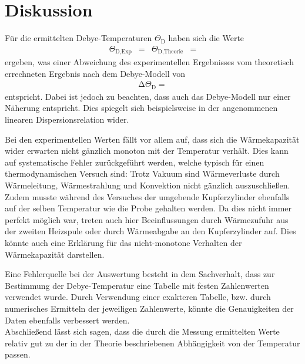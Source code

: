\section{Diskussion}
\label{sec:Diskussion}

Für die ermittelten Debye-Temperaturen $\Theta_\text{D}$ haben sich die Werte
\begin{align*}
  \Theta_{\text{D,Exp}} &=  & \Theta_{\text{D,Theorie}} &= 
\end{align*}
ergeben, was einer Abweichung des experimentellen Ergebnisses vom theoretisch errechneten Ergebnis nach dem Debye-Modell von
\begin{align*}
  \increment \Theta_\text{D} = 
\end{align*}
entspricht.
Dabei ist jedoch zu beachten, dass auch das Debye-Modell nur einer Näherung entspricht.
Dies spiegelt sich beispielsweise in der angenommenen linearen Dispersionsrelation wider.

Bei den experimentellen Werten fällt vor allem auf, dass sich die Wärmekapazität wider erwarten nicht gänzlich monoton mit der Temperatur verhält.
Dies kann auf systematische Fehler zurückgeführt werden, welche typisch für einen thermodynamischen Versuch sind:
Trotz Vakuum sind Wärmeverluste durch Wärmeleitung, Wärmestrahlung und Konvektion nicht gänzlich auszuschließen.
Zudem musste während des Versuches der umgebende Kupferzylinder ebenfalls auf der selben Temperatur wie die Probe gehalten werden.
Da dies nicht immer perfekt möglich war, treten auch hier Beeinflussungen durch Wärmezufuhr aus der zweiten Heizspule oder durch Wärmeabgabe an den Kupferzylinder auf.
Dies könnte auch eine Erklärung für das nicht-monotone Verhalten der Wärmekapazität darstellen.

Eine Fehlerquelle bei der Auswertung besteht in dem Sachverhalt, dass zur Bestimmung der Debye-Temperatur eine Tabelle mit festen Zahlenwerten verwendet wurde.
Durch Verwendung einer exakteren Tabelle, bzw. durch numerisches Ermitteln der jeweiligen Zahlenwerte, könnte die Genauigkeiten der Daten ebenfalls verbessert werden.\\
Abschließend lässt sich sagen, dass die durch die Messung ermittelten Werte relativ gut zu der in der Theorie beschriebenen Abhängigkeit von der Temperatur passen.
